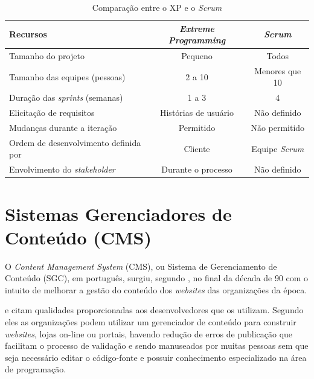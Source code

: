 \begin{table}[h]
\centering
{}
\caption{Comparação entre o XP e o \textit{Scrum}}
\vspace{0.5cm}
\begin{tabular}{l|c|c}
 
\textbf{Recursos} & \textbf{\textit{Extreme Programming}} & \textbf{\textit{Scrum}}  \\ %
\hline                               %
Tamanho do projeto & Pequeno & Todos \\
Tamanho das equipes (pessoas) & 2 a 10 & Menores que 10 \\
Duração das \textit{sprints} (semanas) & 1 a 3 & 4 \\
Elicitação de requisitos & Histórias de usuário & Não definido \\
Mudanças durante a iteração & Permitido & Não permitido \\          %
Ordem de desenvolvimento definida por & Cliente & Equipe \textit{Scrum} \\
Envolvimento do \textit{stakeholder} & Durante o processo & Não definido \\
\hline
\end{tabular}
\label{scrumVSxp}
\end{table}


\hspace{2.5cm}
\section{Sistemas Gerenciadores de Conteúdo (CMS)}
\label{sec:cms}
\hspace{2.5cm}

O \textit{Content Management System} (CMS), ou Sistema de Gerenciamento de Conteúdo (SGC), em português, surgiu, segundo \cite{chagas2018estudo},
no final da década de 90 com o intuito de melhorar a gestão do conteúdo dos \textit{websites} das organizações da época.  

 e  citam qualidades proporcionadas aos desenvolvedores que os utilizam.
Segundo eles as organizações podem utilizar um gerenciador de conteúdo para construir \textit{websites},
lojas on-line ou portais, havendo redução de erros de publicação que facilitam o processo de validação e sendo manuseados por muitas
pessoas sem que seja necessário editar o código-fonte e possuir conhecimento especializado na área de programação.

